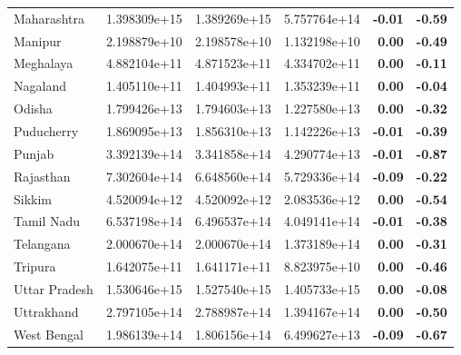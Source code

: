 \begin{table}
{\begin{tabular}[t]{lrrr>{\bfseries}r>{\bfseries}r}
Maharashtra & 1.398309e+15 & 1.389269e+15 & 5.757764e+14 & -0.01 & -0.59\\
\addlinespace
Manipur & 2.198879e+10 & 2.198578e+10 & 1.132198e+10 & 0.00 & -0.49\\
Meghalaya & 4.882104e+11 & 4.871523e+11 & 4.334702e+11 & 0.00 & -0.11\\
Nagaland & 1.405110e+11 & 1.404993e+11 & 1.353239e+11 & 0.00 & -0.04\\
Odisha & 1.799426e+13 & 1.794603e+13 & 1.227580e+13 & 0.00 & -0.32\\
Puducherry & 1.869095e+13 & 1.856310e+13 & 1.142226e+13 & -0.01 & -0.39\\
\addlinespace
Punjab & 3.392139e+14 & 3.341858e+14 & 4.290774e+13 & -0.01 & -0.87\\
Rajasthan & 7.302604e+14 & 6.648560e+14 & 5.729336e+14 & -0.09 & -0.22\\
Sikkim & 4.520094e+12 & 4.520092e+12 & 2.083536e+12 & 0.00 & -0.54\\
Tamil Nadu & 6.537198e+14 & 6.496537e+14 & 4.049141e+14 & -0.01 & -0.38\\
Telangana & 2.000670e+14 & 2.000670e+14 & 1.373189e+14 & 0.00 & -0.31\\
\addlinespace
Tripura & 1.642075e+11 & 1.641171e+11 & 8.823975e+10 & 0.00 & -0.46\\
Uttar Pradesh & 1.530646e+15 & 1.527540e+15 & 1.405733e+15 & 0.00 & -0.08\\
Uttrakhand & 2.797105e+14 & 2.788987e+14 & 1.394167e+14 & 0.00 & -0.50\\
West Bengal & 1.986139e+14 & 1.806156e+14 & 6.499627e+13 & -0.09 & -0.67\\
\bottomrule
\end{tabular}}
\end{table}
